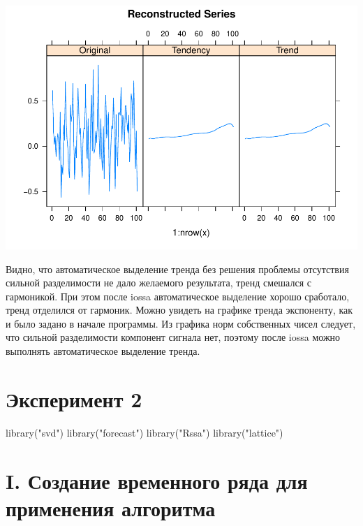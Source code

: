 \documentclass[specialist,
               substylefile = spbu_report.rtx,
               subf,href,colorlinks=true, 12pt]{disser}
\theoremstyle{definition}
\newenvironment{Shaded}{\begin{snugshade}}{\end{snugshade}}
\newcommand{\FunctionTok}[1]{\textcolor[rgb]{0.00,0.00,0.00}{#1}}
\newcommand{\NormalTok}[1]{#1}
\newcommand{\StringTok}[1]{\textcolor[rgb]{0.31,0.60,0.02}{#1}}
\begin{document}
\includegraphics{iossa_example/iossa_trend-1.pdf}

Видно, что автоматическое выделение тренда без решения проблемы
отсутствия сильной разделимости не дало желаемого результата, тренд
смешался с гармоникой. При этом после iossa автоматическое выделение
хорошо сработало, тренд отделился от гармоник. Можно увидеть на графике
тренда экспоненту, как и было задано в начале программы. Из графика норм
собственных чисел следует, что сильной разделимости компонент сигнала
нет, поэтому после iossa можно выполнять автоматическое выделение
тренда.
\section{Эксперимент 2}
\begin{Shaded}
\begin{Highlighting}[]
  \FunctionTok{library}\NormalTok{(}\StringTok{"svd"}\NormalTok{)}
  \FunctionTok{library}\NormalTok{(}\StringTok{"forecast"}\NormalTok{)}
  \FunctionTok{library}\NormalTok{(}\StringTok{"Rssa"}\NormalTok{)}
  \FunctionTok{library}\NormalTok{(}\StringTok{"lattice"}\NormalTok{)}
\end{Highlighting}
\end{Shaded}

\hypertarget{i.-ux441ux43eux437ux434ux430ux43dux438ux435-ux432ux440ux435ux43cux435ux43dux43dux43eux433ux43e-ux440ux44fux434ux430-ux434ux43bux44f-ux43fux440ux438ux43cux435ux43dux435ux43dux438ux44f-ux430ux43bux433ux43eux440ux438ux442ux43cux430}{%
\section{I. Создание временного ряда для применения
алгоритма}\label{i.-ux441ux43eux437ux434ux430ux43dux438ux435-ux432ux440ux435ux43cux435ux43dux43dux43eux433ux43e-ux440ux44fux434ux430-ux434ux43bux44f-ux43fux440ux438ux43cux435ux43dux435ux43dux438ux44f-ux430ux43bux433ux43eux440ux438ux442ux43cux430}}
\end{document}
